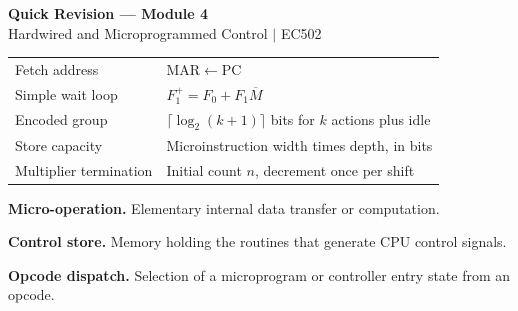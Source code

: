 \documentclass[12pt,a4paper]{article}
\renewcommand{\arraystretch}{1.45}
\begin{document}
\newpage
\begin{center}
  {\large\bfseries\color{myred} Quick Revision --- Module 4}\\[3pt]
  {\small\color{mydark} Hardwired and Microprogrammed Control $|$ EC502}
\end{center}
\noindent{\color{myred}\rule{\linewidth}{1.2pt}}
\begin{tcolorbox}[formulabox,title={Key Formulas at a Glance}]
\renewcommand{\arraystretch}{1.35}
\begin{tabularx}{\linewidth}{B{5.0cm}Y}
Fetch address & $\mathrm{MAR}\leftarrow\mathrm{PC}$ \\[3pt]
Simple wait loop & $F_1^{+}=F_0+F_1\overline M$ \\[3pt]
Encoded group & $\lceil\log_2(k+1)\rceil$ bits for $k$ actions plus idle \\[3pt]
Store capacity & Microinstruction width times depth, in bits \\[3pt]
Multiplier termination & Initial count $n$, decrement once per shift \\[3pt]
\end{tabularx}
\end{tcolorbox}
\begin{tcolorbox}[defbox,title={One-Line Definitions}]
\textbf{Micro-operation.} Elementary internal data transfer or computation.\par
\textbf{Control store.} Memory holding the routines that generate CPU control signals.\par
\textbf{Opcode dispatch.} Selection of a microprogram or controller entry state from an opcode.\par
\end{tcolorbox}
\end{document}
